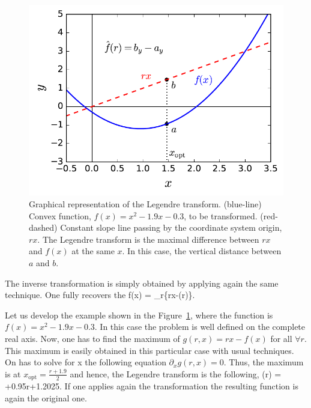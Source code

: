 \begin{figure}
  \centering
  \includegraphics[scale=.65]{img/plots/LT_legendre.pdf}
  \caption{Graphical representation of the Legendre transform. (blue-line) Convex function, $f(x)=x^2-1.9x-0.3$, to be transformed. (red-dashed) Constant slope line passing by the coordinate system origin, $rx$. The Legendre transform is the maximal difference between $rx$ and $f(x)$ at the same $x$. In this case, the vertical distance between $a$ and $b$.}
  \label{fig:lt-geometric-legendre}
\end{figure}

The inverse transformation is simply obtained by applying again the same technique.
One fully recovers the
\be
  f(x) = \max_{r}\{rx-(r)\}.
\ee

Let us develop the example shown in the Figure~\ref{fig:lt-geometric-legendre}, where the function is $f(x)=x^2-1.9x-0.3$.
In this case the problem is well defined on the complete real axis.
Now, one has to find the maximum of $g(r,x)=rx-f(x)$ for all $\forall r$.
This maximum is easily obtained in this particular case with usual techniques.
On has to solve for x the following equation $\partial_x g(r,x) = 0$. Thus, the maximum is at $x_{\text{opt}} = \frac{r+1.9}{2}$ and hence, the Legendre transform is the following,
\be
  (r) = +0.95r+1.2025.
\ee
If one applies again the transformation the resulting function is again the original one.
